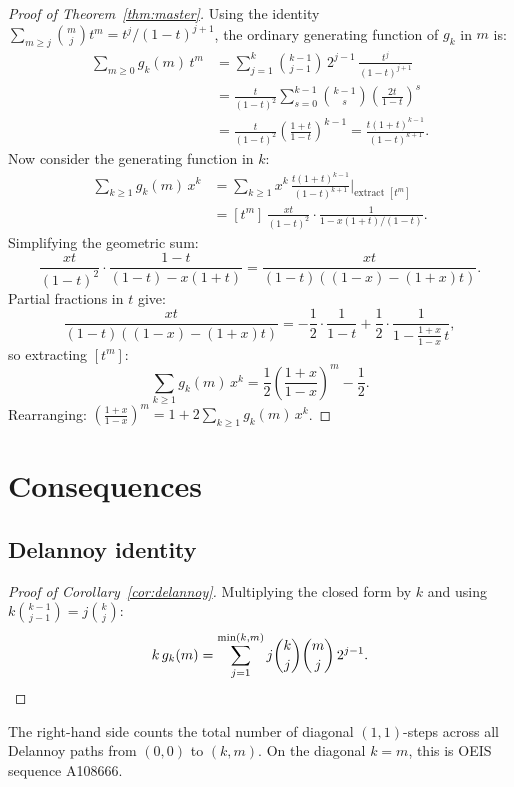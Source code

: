 \documentclass[11pt]{amsart}
\theoremstyle{definition}
\begin{document}
\begin{proof}[Proof of Theorem~\ref{thm:master}]
Using the identity $\sum_{m \geq j} \binom{m}{j} t^m = t^j/(1-t)^{j+1}$, the ordinary generating function of $g_k$ in $m$ is:
\begin{align*}
\sum_{m \geq 0} g_k(m)\, t^m &= \sum_{j=1}^{k} \binom{k-1}{j-1}\, 2^{j-1}\, \frac{t^j}{(1-t)^{j+1}} \\
&= \frac{t}{(1-t)^2} \sum_{s=0}^{k-1} \binom{k-1}{s}\left(\frac{2t}{1-t}\right)^s \\
&= \frac{t}{(1-t)^2} \left(\frac{1+t}{1-t}\right)^{k-1} = \frac{t(1+t)^{k-1}}{(1-t)^{k+1}}.
\end{align*}
Now consider the generating function in $k$:
\begin{align*}
\sum_{k \geq 1} g_k(m)\, x^k &= \sum_{k \geq 1} x^k\, \frac{t(1+t)^{k-1}}{(1-t)^{k+1}} \bigg|_{\text{extract } [t^m]} \\
&= [t^m]\, \frac{xt}{(1-t)^2} \cdot \frac{1}{1 - x(1+t)/(1-t)}.
\end{align*}
Simplifying the geometric sum:
\[
\frac{xt}{(1-t)^2} \cdot \frac{1-t}{(1-t) - x(1+t)} = \frac{xt}{(1-t)((1-x) - (1+x)t)}.
\]
Partial fractions in $t$ give:
\[
\frac{xt}{(1-t)((1-x)-(1+x)t)} = -\frac{1}{2} \cdot \frac{1}{1-t} + \frac{1}{2} \cdot \frac{1}{1 - \frac{1+x}{1-x}\, t},
\]
so extracting $[t^m]$:
\[
\sum_{k \geq 1} g_k(m)\, x^k = \frac{1}{2}\left(\frac{1+x}{1-x}\right)^m - \frac{1}{2}.
\]
Rearranging: $\left(\frac{1+x}{1-x}\right)^m = 1 + 2\sum_{k \geq 1} g_k(m)\, x^k$.
\end{proof}

\section{Consequences}

\subsection{Delannoy identity}

\begin{proof}[Proof of Corollary~\ref{cor:delannoy}]
Multiplying the closed form by $k$ and using $k\binom{k-1}{j-1} = j\binom{k}{j}$:
\[
k\, g_k(m) = \sum_{j=1}^{\min(k,m)} j\binom{k}{j}\binom{m}{j}\, 2^{j-1}. \qedhere
\]
\end{proof}

The right-hand side counts the total number of diagonal $(1,1)$-steps across all Delannoy paths from $(0,0)$ to $(k,m)$. On the diagonal $k = m$, this is OEIS sequence A108666.
\end{document}
